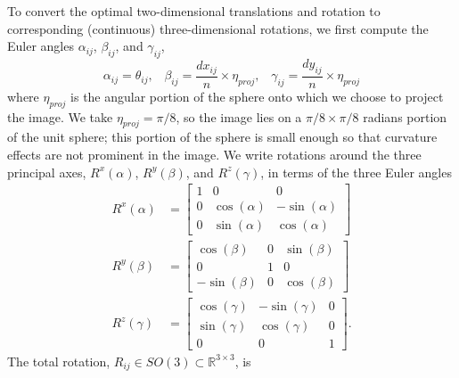 \documentclass{pnastwo}
\begin{document}
\begin{article}
To convert the optimal two-dimensional translations and rotation to corresponding (continuous) three-dimensional rotations,
we first compute the Euler angles $\alpha_{ij}$, $\beta_{ij}$, and $\gamma_{ij}$,
\begin{equation} \label{eq:angle_relations}
	\alpha_{ij} = \theta_{ij}, \; \; \;
	\beta_{ij} = \frac{dx_{ij}}{n} \times \eta_{proj}, \; \; \;
	\gamma_{ij} = \frac{dy_{ij}}{n} \times \eta_{proj}
\end{equation}
where $\eta_{proj}$ is the angular portion of the sphere onto which we choose to project the image.
%
We take $\eta_{proj} =  \pi/8$, so the image lies on a $\pi/8 \times \pi/8$ radians portion of the unit sphere;
this portion of the sphere is small enough so that curvature effects are not prominent in the image.
%
We write rotations around the three principal axes, $R^x(\alpha)$, $R^y(\beta)$, and $R^z(\gamma)$, in terms of the three Euler angles
\begin{equation} \label{eq:three_rot}
\begin{aligned}
	R^x(\alpha) &= \begin{bmatrix}
	1 & 0 & 0 \\
    0 & \cos(\alpha) & -\sin(\alpha) \\
    0 & \sin(\alpha) & \cos(\alpha)
	\end{bmatrix} \\
	R^y(\beta) &= \begin{bmatrix}
	\cos(\beta) & 0 & \sin(\beta) \\
    0 & 1 & 0 \\
    -\sin(\beta) & 0 & \cos(\beta)
    \end{bmatrix} \\
	R^z(\gamma) &= \begin{bmatrix}
	\cos(\gamma) & -\sin(\gamma) & 0 \\
    \sin(\gamma) & \cos(\gamma) & 0 \\
    0 & 0 & 1
    \end{bmatrix}.
\end{aligned}
\end{equation}
%
The total rotation, $R_{ij} \in SO(3) \subset \mathbb{R}^{3 \times 3}$, is

\end{article}
\end{document}
